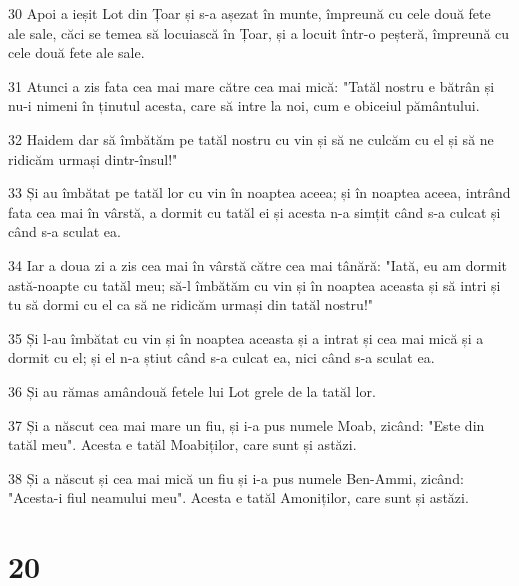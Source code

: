 \par 30 Apoi a ieșit Lot din Țoar și s-a așezat în munte, împreună cu cele două fete ale sale, căci se temea să locuiască în Țoar, și a locuit într-o peșteră, împreună cu cele două fete ale sale.
\par 31 Atunci a zis fata cea mai mare către cea mai mică: "Tatăl nostru e bătrân și nu-i nimeni în ținutul acesta, care să intre la noi, cum e obiceiul pământului.
\par 32 Haidem dar să îmbătăm pe tatăl nostru cu vin și să ne culcăm cu el și să ne ridicăm urmași dintr-însul!"
\par 33 Și au îmbătat pe tatăl lor cu vin în noaptea aceea; și în noaptea aceea, intrând fata cea mai în vârstă, a dormit cu tatăl ei și acesta n-a simțit când s-a culcat și când s-a sculat ea.
\par 34 Iar a doua zi a zis cea mai în vârstă către cea mai tânără: "Iată, eu am dormit astă-noapte cu tatăl meu; să-l îmbătăm cu vin și în noaptea aceasta și să intri și tu să dormi cu el ca să ne ridicăm urmași din tatăl nostru!"
\par 35 Și l-au îmbătat cu vin și în noaptea aceasta și a intrat și cea mai mică și a dormit cu el; și el n-a știut când s-a culcat ea, nici când s-a sculat ea.
\par 36 Și au rămas amândouă fetele lui Lot grele de la tatăl lor.
\par 37 Și a născut cea mai mare un fiu, și i-a pus numele Moab, zicând: "Este din tatăl meu". Acesta e tatăl Moabiților, care sunt și astăzi.
\par 38 Și a născut și cea mai mică un fiu și i-a pus numele Ben-Ammi, zicând: "Acesta-i fiul neamului meu". Acesta e tatăl Amoniților, care sunt și astăzi.

\chapter{20}

